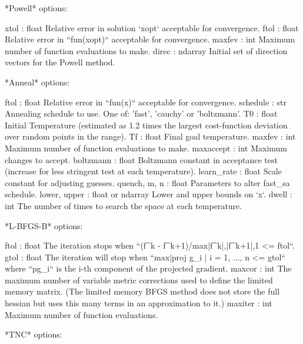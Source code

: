 \begin{DoxyVerb}
*Powell* options:

    xtol : float
        Relative error in solution `xopt` acceptable for convergence.
    ftol : float
        Relative error in ``fun(xopt)`` acceptable for convergence.
    maxfev : int
        Maximum number of function evaluations to make.
    direc : ndarray
        Initial set of direction vectors for the Powell method.

*Anneal* options:

    ftol : float
        Relative error in ``fun(x)`` acceptable for convergence.
    schedule : str
        Annealing schedule to use. One of: 'fast', 'cauchy' or
        'boltzmann'.
    T0 : float
        Initial Temperature (estimated as 1.2 times the largest
        cost-function deviation over random points in the range).
    Tf : float
        Final goal temperature.
    maxfev : int
        Maximum number of function evaluations to make.
    maxaccept : int
        Maximum changes to accept.
    boltzmann : float
        Boltzmann constant in acceptance test (increase for less
        stringent test at each temperature).
    learn_rate : float
        Scale constant for adjusting guesses.
    quench, m, n : float
        Parameters to alter fast_sa schedule.
    lower, upper : float or ndarray
        Lower and upper bounds on `x`.
    dwell : int
        The number of times to search the space at each temperature.

*L-BFGS-B* options:

    ftol : float
        The iteration stops when ``(f^k -
        f^{k+1})/max{|f^k|,|f^{k+1}|,1} <= ftol``.
    gtol : float
        The iteration will stop when ``max{|proj g_i | i = 1, ..., n}
        <= gtol`` where ``pg_i`` is the i-th component of the
        projected gradient.
    maxcor : int
        The maximum number of variable metric corrections used to
        define the limited memory matrix. (The limited memory BFGS
        method does not store the full hessian but uses this many terms
        in an approximation to it.)
    maxiter : int
        Maximum number of function evaluations.

*TNC* options:


\end{DoxyVerb}
